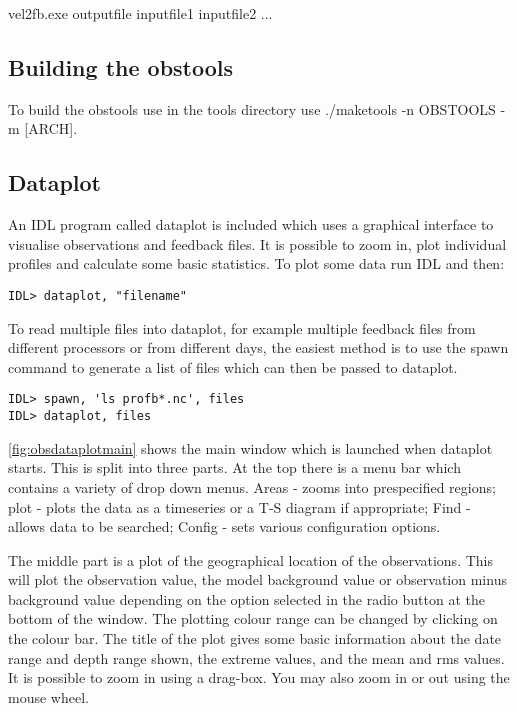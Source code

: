 \documentclass[../main/NEMO_manual]{subfiles}
\begin{document}
\footnotesize
\begin{cmds}
vel2fb.exe outputfile inputfile1 inputfile2 ...
\end{cmds}

\subsection{Building the obstools}

To build the obstools use in the tools directory use ./maketools -n OBSTOOLS -m [ARCH].

\subsection{Dataplot}

An IDL program called dataplot is included which uses a graphical interface to
visualise observations and feedback files.
It is possible to zoom in, plot individual profiles and calculate some basic statistics.
To plot some data run IDL and then:
\footnotesize
\begin{verbatim}
IDL> dataplot, "filename"
\end{verbatim}

To read multiple files into dataplot,
for example multiple feedback files from different processors or from different days,
the easiest method is to use the spawn command to generate a list of files which can then be passed to dataplot.
\footnotesize
\begin{verbatim}
IDL> spawn, 'ls profb*.nc', files
IDL> dataplot, files
\end{verbatim}

\autoref{fig:obsdataplotmain} shows the main window which is launched when dataplot starts.
This is split into three parts.
At the top there is a menu bar which contains a variety of drop down menus.
Areas - zooms into prespecified regions;
plot - plots the data as a timeseries or a T-S diagram if appropriate;
Find - allows data to be searched;
Config - sets various configuration options.

The middle part is a plot of the geographical location of the observations.
This will plot the observation value, the model background value or observation minus background value depending on
the option selected in the radio button at the bottom of the window.
The plotting colour range can be changed by clicking on the colour bar.
The title of the plot gives some basic information about the date range and depth range shown,
the extreme values, and the mean and rms values.
It is possible to zoom in using a drag-box.
You may also zoom in or out using the mouse wheel.
\end{document}
